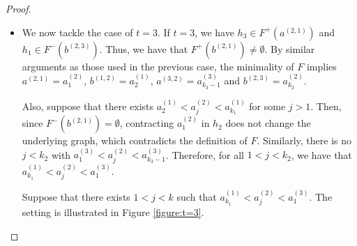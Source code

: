 \documentclass[12pt]{article}
\theoremstyle{definition}
\begin{document}
\begin{proof}
\begin{itemize}
             \item We now tackle the case of $t = 3$.
             If $t = 3$, we have $h_3 \in F^{+}
             \left(a^{\left(2, 1\right)}\right)$ 
             and $h_1 \in F^{-}\left(b^{\left(2, 3\right)}\right)$.
             Thus, we have that $F^{+}\left(b^{\left(2, 1\right)}\right)
             \neq \emptyset$.
             By similar arguments as those
             used in the previous case,
             the minimality of $F$ implies
             $a^{\left(2, 1\right)} = a_1^{\left(2\right)}$,
             $b^{\left(1, 2\right)} = a_2^{\left(1\right)}$,
             $a^{\left(3, 2\right)} = a_{k_3 - 1}^{\left(3\right)}$ and
             $b^{\left(2, 3\right)} = a_{k_2}^{\left(2\right)}$.

             Also, suppose that there exists
             $a_2^{\left(1\right)} < a_{j}^{\left(2\right)} <
             a_{k_1}^{\left(1\right)}$ for
             some $j > 1$. Then,
             since $F^{-}\left(b^{\left(2, 1\right)}\right) = \emptyset$, 
             contracting $a_1^{\left(2\right)}$ 
             in $h_2$ does not change the
             underlying graph, which
             contradicts the definition of $F$.
             Similarly, there is no
             $j < k_2$ with $a_1^{\left(3\right)} <
             a_{j}^{\left(2\right)} <
             a_{k_3-1}^{\left(3\right)}$.
             Therefore, for all
             $1 < j < k_2$, we have
             that $a_{k_1}^{\left(1\right)} < 
             a_{j}^{\left(2\right)} < 
             a_1^{\left(3\right)}$.

             Suppose that there exists
             $1 < j < k$ such that
             $a_{k_1}^{\left(1\right)} <
             a_{j}^{\left(2\right)} <
             a_1^{\left(3\right)}$.
             The setting is illustrated
             in Figure \ref{figure:t=3}.
             
             \begin{figure}[ht]
             \begin{center}
\end{center}
\end{figure}
\end{itemize}
\end{proof}
\end{document}
